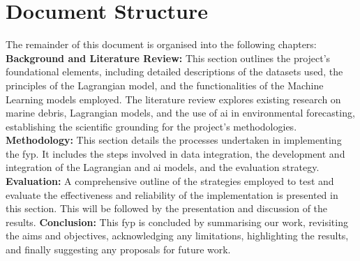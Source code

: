 \section{Document Structure}
\label{sec:document_structure}
The remainder of this document is organised into the following chapters:\newline\newline
\textbf{Background and Literature Review:} This section outlines the project's foundational elements, including detailed descriptions of the datasets used, the principles of the Lagrangian model, and the functionalities of the Machine Learning models employed. The literature review explores existing research on marine debris, Lagrangian models, and the use of \acrshort{ai} in environmental forecasting, establishing the scientific grounding for the project’s methodologies. \newline\newline
\textbf{Methodology:} This section details the processes undertaken in implementing the \acrshort{fyp}. It includes the steps involved in data integration, the development and integration of the Lagrangian and \acrshort{ai} models, and the evaluation strategy.\newline\newline
\textbf{Evaluation:} A comprehensive outline of the strategies employed to test and evaluate the effectiveness and reliability of the implementation is presented in this section. This will be followed by the presentation and discussion of the results.\newline\newline
\textbf{Conclusion:} This \acrshort{fyp} is concluded by summarising our work, revisiting the aims and objectives, acknowledging any limitations, highlighting the results, and finally suggesting any proposals for future work.